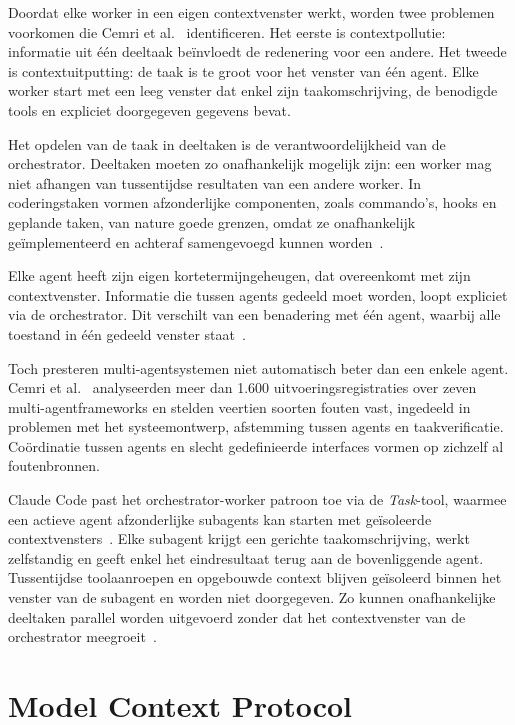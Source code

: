 Doordat elke worker in een eigen contextvenster werkt, worden twee problemen voorkomen die Cemri et al.~\cite{cemri2025multiagentfail} identificeren. Het eerste is contextpollutie: informatie uit één deeltaak beïnvloedt de redenering voor een andere. Het tweede is contextuitputting: de taak is te groot voor het venster van één agent. Elke worker start met een leeg venster dat enkel zijn taakomschrijving, de benodigde tools en expliciet doorgegeven gegevens bevat.

Het opdelen van de taak in deeltaken is de verantwoordelijkheid van de orchestrator. Deeltaken moeten zo onafhankelijk mogelijk zijn: een worker mag niet afhangen van tussentijdse resultaten van een andere worker. In coderingstaken vormen afzonderlijke componenten, zoals commando's, hooks en geplande taken, van nature goede grenzen, omdat ze onafhankelijk geïmplementeerd en achteraf samengevoegd kunnen worden~\cite{cemri2025multiagentfail}.

Elke agent heeft zijn eigen kortetermijngeheugen, dat overeenkomt met zijn contextvenster. Informatie die tussen agents gedeeld moet worden, loopt expliciet via de orchestrator. Dit verschilt van een benadering met één agent, waarbij alle toestand in één gedeeld venster staat~\cite{wang2023agents}.

Toch presteren multi-agentsystemen niet automatisch beter dan een enkele agent. Cemri et al.~\cite{cemri2025multiagentfail} analyseerden meer dan 1.600 uitvoeringsregistraties over zeven multi-agentframeworks en stelden veertien soorten fouten vast, ingedeeld in problemen met het systeemontwerp, afstemming tussen agents en taakverificatie. Coördinatie tussen agents en slecht gedefinieerde interfaces vormen op zichzelf al foutenbronnen.

Claude Code past het orchestrator-worker patroon toe via de \textit{Task}-tool, waarmee een actieve agent afzonderlijke subagents kan starten met geïsoleerde contextvensters~\cite{claudecode_subagents}. Elke subagent krijgt een gerichte taakomschrijving, werkt zelfstandig en geeft enkel het eindresultaat terug aan de bovenliggende agent. Tussentijdse toolaanroepen en opgebouwde context blijven geïsoleerd binnen het venster van de subagent en worden niet doorgegeven. Zo kunnen onafhankelijke deeltaken parallel worden uitgevoerd zonder dat het contextvenster van de orchestrator meegroeit~\cite{claudecode_subagents}.

\section{Model Context Protocol}\label{sec:mcp}

